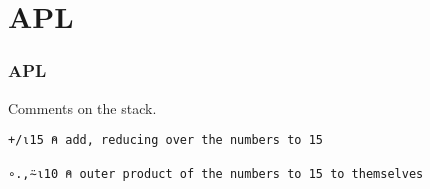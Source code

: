 \documentclass[aspectratio=169]{beamer}
\begin{document}
  \section{APL}
  \begin{frame}[fragile]
    \frametitle{APL}
    \begin{listing}[H]
      \caption{Comments on the stack.}
      \begin{verbatim}
+/⍳15 ⍝ add, reducing over the numbers to 15

∘.,⍨⍳10 ⍝ outer product of the numbers to 15 to themselves
      \end{verbatim}
    \end{listing}
  \end{frame}
\end{document}
